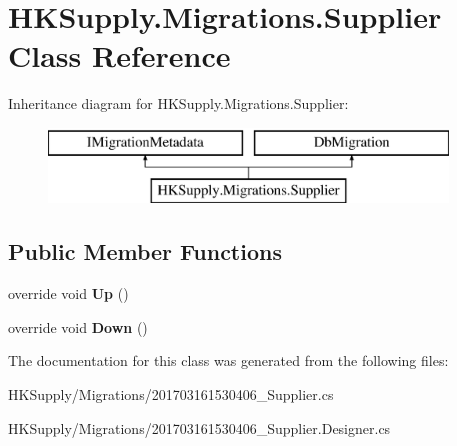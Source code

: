 \hypertarget{class_h_k_supply_1_1_migrations_1_1_supplier}{}\section{H\+K\+Supply.\+Migrations.\+Supplier Class Reference}
\label{class_h_k_supply_1_1_migrations_1_1_supplier}
Inheritance diagram for H\+K\+Supply.\+Migrations.\+Supplier\+:\begin{figure}[H]
\begin{center}
\leavevmode
\includegraphics[height=2.000000cm]{class_h_k_supply_1_1_migrations_1_1_supplier}
\end{center}
\end{figure}
\subsection*{Public Member Functions}
\begin{DoxyCompactItemize}
\item 
\mbox{\label{class_h_k_supply_1_1_migrations_1_1_supplier_a7e0f400dcc0f8281541672162e9ee4fb}} 
override void {\bfseries Up} ()
\item 
\mbox{\label{class_h_k_supply_1_1_migrations_1_1_supplier_acfb63cfb2f5c74b61c2983a8636259ed}} 
override void {\bfseries Down} ()
\end{DoxyCompactItemize}


The documentation for this class was generated from the following files\+:\begin{DoxyCompactItemize}
\item 
H\+K\+Supply/\+Migrations/201703161530406\+\_\+\+Supplier.\+cs\item 
H\+K\+Supply/\+Migrations/201703161530406\+\_\+\+Supplier.\+Designer.\+cs\end{DoxyCompactItemize}
